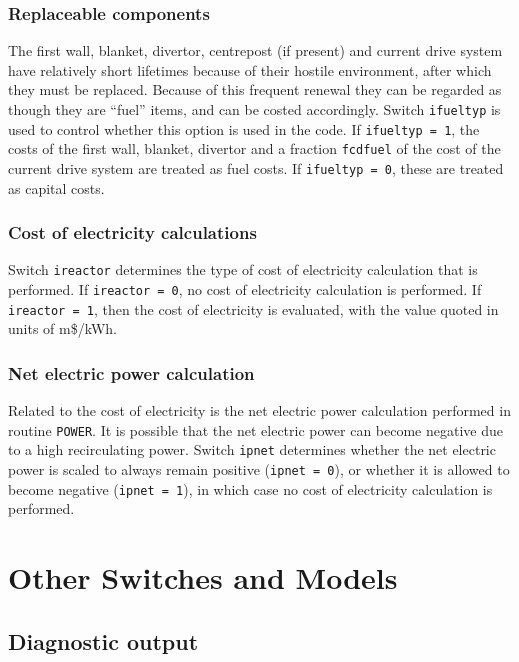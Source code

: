 \documentclass[11pt,a4paper]{report}
\begin{document}
\subsubsection{Replaceable components}

The first wall, blanket, divertor, centrepost (if present) and current drive
system have relatively short lifetimes because of their hostile environment,
after which they must be replaced. Because of this frequent renewal they can
be regarded as though they are ``fuel'' items, and can be costed
accordingly. Switch \texttt{ifueltyp} is used to control whether this option
is used in the code. If \texttt{ifueltyp = 1}, the costs of the first wall,
blanket, divertor and a fraction \texttt{fcdfuel} of the cost of the current
drive system are treated as fuel costs. If \texttt{ifueltyp = 0}, these are
treated as capital costs.

\subsubsection{Cost of electricity calculations}

Switch \texttt{ireactor} determines the type of cost of electricity
calculation that is performed. If \texttt{ireactor = 0}, no cost of
electricity calculation is performed. If \texttt{ireactor = 1}, then the cost
of electricity is evaluated, with the value quoted in units of m\$/kWh.

\subsubsection{Net electric power calculation}

Related to the cost of electricity is the net electric power calculation
performed in routine \texttt{POWER}. It is possible that the net electric
power can become negative due to a high recirculating power. Switch
\texttt{ipnet} determines whether the net electric power is scaled to always
remain positive (\texttt{ipnet = 0}), or whether it is allowed to become
negative (\texttt{ipnet = 1}), in which case no cost of electricity
calculation is performed.

\section{Other Switches and Models}

\subsection{Diagnostic output}
\end{document}
